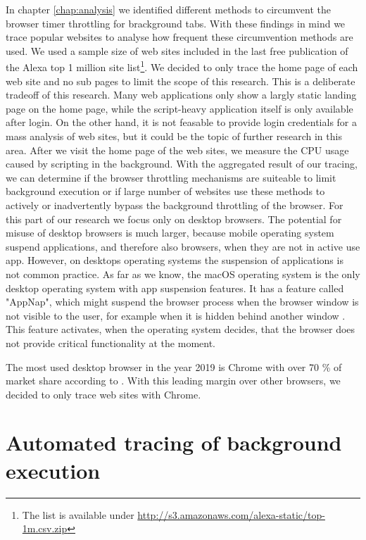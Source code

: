 \documentclass[
	ruledheaders=section,%
	class=report,%
	thesis={type=bachelor},%
	accentcolor=9c,%
	custommargins=true,%
	marginpar=false,%
	parskip=half-,%
	fontsize=11pt,%
]{tudapub}
\begin{document}
  In chapter \ref{chap:analysis} we identified different methods to circumvent the browser timer throttling for brackground tabs. With these findings in mind we trace popular websites to analyse how frequent these circumvention methods are used. We used a sample size of web sites included in the last free publication of the Alexa top 1 million site list\footnote{The list is available under \url{http://s3.amazonaws.com/alexa-static/top-1m.csv.zip}}. We decided to only trace the home page of each web site and no sub pages to limit the scope of this research. This is a deliberate tradeoff of this research. Many web applications only show a largly static landing page on the home page, while the script-heavy application itself is only available after login. On the other hand, it is not feasable to provide login credentials for a mass analysis of web sites, but it could be the topic of further research in this area. After we visit the home page of the web sites, we measure the CPU usage caused by scripting in the background. With the aggregated result of our tracing, we can determine if the browser throttling mechanisms are suiteable to limit background execution or if large number of websites use these methods to actively or inadvertently bypass the background throttling of the browser. For this part of our research we focus only on desktop browsers. The potential for misuse of desktop browsers is much larger, because mobile operating system suspend applications, and therefore also browsers, when they are not in active use app. However, on desktops operating systems the suspension of applications is not common practice. As far as we know, the macOS operating system is the only desktop operating system with app suspension features. It has a feature called "AppNap", which might suspend the browser process when the browser window is not visible to the user, for example when it is hidden behind another window \cite{osx-app-nap}. This feature activates, when the operating system decides, that the browser does not provide critical functionality at the moment.

  The most used desktop browser in the year 2019 is Chrome with over 70 \% of market share according to \cite{statcounter-desktop-browser-market-share}. With this leading margin over other browsers, we decided to only trace web sites with Chrome.
  
  \section{Automated tracing of background execution}
\end{document}

